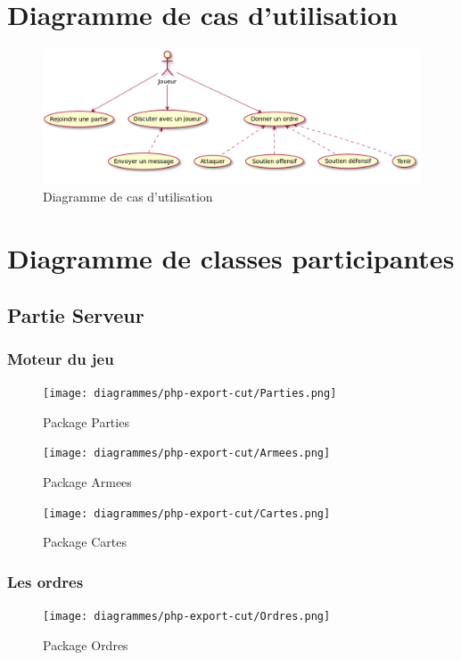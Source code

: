 \section{Diagramme de cas d'utilisation}
	\begin{figure}[!h]
		\centering
		\includegraphics[scale=0.4]{images/UseCase.png}
		\caption{Diagramme de cas d'utilisation}
	\end{figure}

\newpage

\section{Diagramme de classes participantes}
	\subsection{Partie Serveur}
		\subsubsection{Moteur du jeu}
			\begin{figure}[!h]
				\centering
                \texttt{[image: diagrammes/php-export-cut/Parties.png]}
				\caption{Package Parties}
			\end{figure}
			\begin{figure}[!h]
				\centering
                \texttt{[image: diagrammes/php-export-cut/Armees.png]}
				\caption{Package Armees}
			\end{figure}
			\begin{figure}[!h]
				\centering
                \texttt{[image: diagrammes/php-export-cut/Cartes.png]}
				\caption{Package Cartes}
			\end{figure}
		\newpage
        \pagebreak
		\subsubsection{Les ordres}
			\vspace{10mm}
			\begin{figure}[!h]
				\centering
                \texttt{[image: diagrammes/php-export-cut/Ordres.png]}
				\caption{Package Ordres}
			\end{figure}

